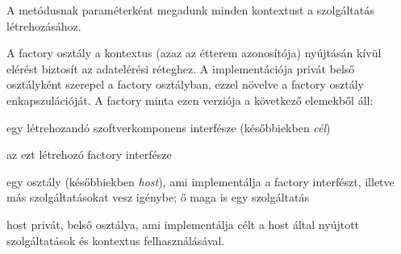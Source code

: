 
A  metódusnak paraméterként megadunk minden kontextust a szolgáltatás létrehozásához. \par


A factory osztály a kontextus (azaz az étterem azonosítója) nyújtásán kívül elérést biztosít az adatelérési réteghez. A  implementációja privát belső osztályként szerepel a factory osztályban, ezzel növelve a factory osztály enkapszulációját. A factory minta ezen verziója a következő elemekből áll: \par

\begin{listing}
	\item egy létrehozandó szoftverkomponens interfésze (későbbiekben \emph{cél})
	\item az ezt létrehozó factory interfésze
	\item egy osztály (későbbiekben \emph{host}), ami implementálja a factory interfészt, illetve más szolgáltatásokat vesz igénybe; ő maga is egy szolgáltatás
	\item host privát, belső osztálya, ami implementálja célt a host által nyújtott szolgáltatások és kontextus felhasználásával.
\end{listing}





